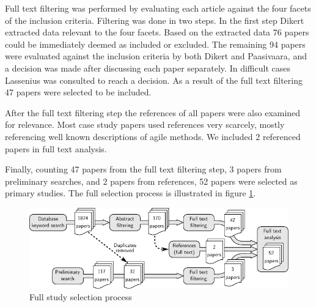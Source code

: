 \documentclass[preprint,authoryear,12pt]{elsarticle}
\begin{document}
%
%
%
%
%
%

Full text filtering was performed by evaluating each article against the four
facets of the inclusion criteria. Filtering was done in two steps. In the first
step Dikert extracted data relevant to the four facets. Based on the extracted
data 76 papers could be immediately deemed as included or excluded. The
remaining 94 papers were evaluated against the inclusion criteria by both Dikert
and Paasivaara, and a decision was made after discussing each paper separately.
In difficult cases Lassenius was consulted to reach a decision. As a result of
the full text filtering 47 papers were selected to be included.

After the full text filtering step the references of all papers were also
examined for relevance. Most case study papers used references very scarcely,
mostly referencing well known descriptions of agile methods. We included 2
referenced papers in full text analysis.

Finally, counting 47 papers from the full text filtering step, 3 papers from
preliminary searches, and 2 papers from references, 52 papers were selected
as primary studies. The full selection process is illustrated in figure
\ref{fig:selectionprocess_full}.

\begin{figure}
  \begin{center}
    \includegraphics[width=1\textwidth]{graphics/research_process_full.pdf}
    \caption{Full study selection process}
    \label{fig:selectionprocess_full}
  \end{center}
\end{figure}
\end{document}
